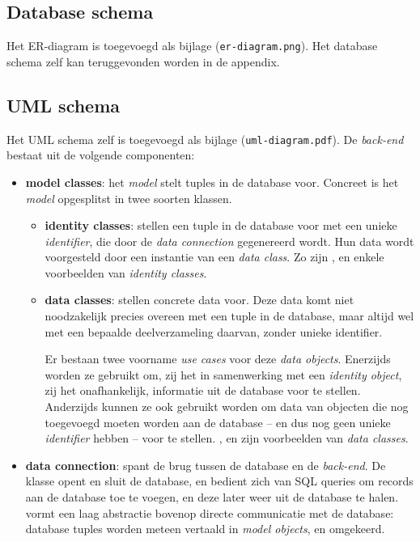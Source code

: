 \documentclass[12pt,parskip=full]{article}
\begin{document}
\subsection{Database schema}
Het ER-diagram is toegevoegd als bijlage (\texttt{er-diagram.png}). Het database schema zelf kan teruggevonden worden in de appendix.

\subsection{UML schema}

Het UML schema zelf is toegevoegd als bijlage (\texttt{uml-diagram.pdf}). De \emph{back-end} bestaat uit de volgende componenten:

\begin{itemize}

\item \textbf{model classes}: het \emph{model} stelt tuples in de database voor. Concreet is het \emph{model} opgesplitst in twee soorten klassen.

\begin{itemize}

\item \textbf{identity classes}: stellen een tuple in de database voor met een 
unieke \emph{identifier}, die door de \emph{data connection} gegenereerd wordt. 
Hun data wordt voorgesteld door een instantie van een \emph{data class}. Zo 
zijn ,  en  enkele voorbeelden van 
\emph{identity classes}.

\item \textbf{data classes}: stellen concrete data voor. Deze data komt niet
noodzakelijk precies overeen met een tuple in de database, maar altijd wel met
een bepaalde deelverzameling daarvan, zonder unieke identifier.

Er bestaan twee voorname \emph{use cases} voor deze \emph{data objects}.
Enerzijds worden ze gebruikt om, zij het in samenwerking met een
  \emph{identity object}, zij het onafhankelijk, informatie uit de database
  voor te stellen.
Anderzijds kunnen ze ook gebruikt worden om data van objecten die nog
  toegevoegd moeten worden aan de database -- en dus nog geen unieke
  \emph{identifier} hebben -- voor te stellen. ,
   en  zijn voorbeelden van \emph{data
  classes}.

\end{itemize}

\item \textbf{data connection}: spant de brug tussen de database en de \emph{back-end}. De  klasse opent en sluit de database, en bedient zich van SQL queries om records aan de database toe te voegen, en deze later weer uit de database te halen.  vormt een laag abstractie bovenop directe communicatie met de database: database tuples worden meteen vertaald in \emph{model objects}, en omgekeerd.


\end{itemize}
\end{document}

